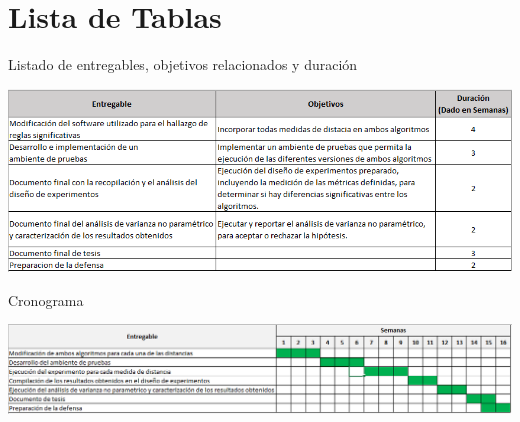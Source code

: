 \section{Lista de Tablas}
\begin{table}[h]
\caption{Listado de entregables, objetivos relacionados y duraci\'on}
\label{arm:tabla}
\begin{center}
\includegraphics[scale=0.7]{deliverables.png}\\
\end{center}
\end{table}
\begin{table}[h]
\caption{Cronograma}
\label{arm:tabla}
\begin{center}
\includegraphics[scale=0.62]{projectPlan.png}\\
\end{center}
\end{table}
\clearpage
